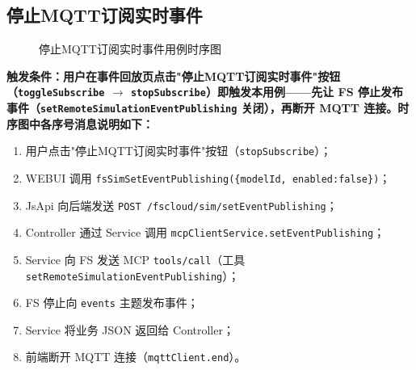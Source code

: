 \subsection{停止MQTT订阅实时事件}
\begin{figure}[!h]
	\centering
	\resizebox{1.0\linewidth}{!}{}
	\caption{停止MQTT订阅实时事件用例时序图}\label{fig:stopSubscribe}
\end{figure}
\bf{触发条件}：用户在事件回放页点击"停止MQTT订阅实时事件"按钮（\texttt{toggleSubscribe} $\rightarrow$ \texttt{stopSubscribe}）即触发本用例——先让 FS 停止发布事件（\texttt{setRemoteSimulationEventPublishing} 关闭），再断开 MQTT 连接。时序图中各序号消息说明如下：
\begin{enumerate}[label=\arabic*)]
	\item 用户点击"停止MQTT订阅实时事件"按钮（\texttt{stopSubscribe}）；
	\item WEBUI 调用 \texttt{fsSimSetEventPublishing(\{modelId, enabled:false\})}；
	\item JsApi 向后端发送 \texttt{POST /fscloud/sim/setEventPublishing}；
	\item Controller 通过 Service 调用 \texttt{mcpClientService.setEventPublishing}；
	\item Service 向 FS 发送 MCP \texttt{tools/call}（工具 \texttt{setRemoteSimulationEventPublishing}）；
	\item FS 停止向 \texttt{events} 主题发布事件；
	\item Service 将业务 JSON 返回给 Controller；
	\item 前端断开 MQTT 连接（\texttt{mqttClient.end}）。
\end{enumerate}
